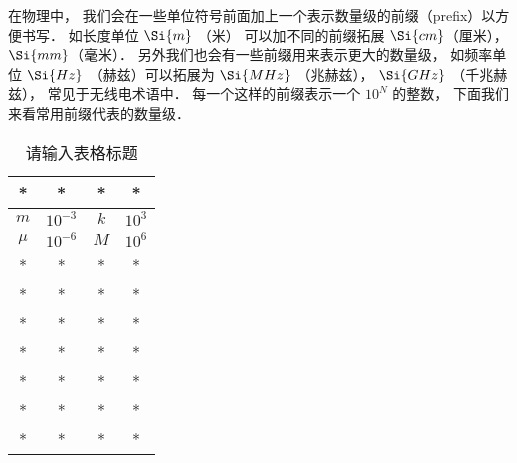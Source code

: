 
在物理中， 我们会在一些单位符号前面加上一个表示数量级的前缀（prefix）以方便书写． 如长度单位 $\Si{m}$ （米） 可以加不同的前缀拓展 $\Si{cm}$（厘米）， $\Si{mm}$（毫米）． 另外我们也会有一些前缀用来表示更大的数量级， 如频率单位 $\Si{Hz}$ （赫兹）可以拓展为 $\Si{MHz}$ （兆赫兹）， $\Si{GHz}$ （千兆赫兹）， 常见于无线电术语中． 每一个这样的前缀表示一个 $10^N$ 的整数， 下面我们来看常用前缀代表的数量级．

\begin{table}[ht]
\centering
\caption{请输入表格标题}\label{UniPre_tab1}
\begin{tabular}{|c|c|c|c|}
\hline
* & * & * & * \\
\hline
$m$ & $10^{-3}$ & $k$ & $10^3$ \\
\hline
$\mu$ & $10^{-6}$ & $M$ & $10^6$ \\
\hline
* & * & * & * \\
\hline
* & * & * & * \\
\hline
* & * & * & * \\
\hline
* & * & * & * \\
\hline
* & * & * & * \\
\hline
* & * & * & * \\
\hline
* & * & * & * \\
\hline
\end{tabular}
\end{table}
